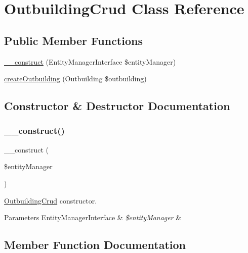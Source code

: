 \hypertarget{class_app_1_1_d_a_l_1_1_outbuilding_crud}{}\section{Outbuilding\+Crud Class Reference}
\label{class_app_1_1_d_a_l_1_1_outbuilding_crud}
\subsection*{Public Member Functions}
\begin{DoxyCompactItemize}
\item 
\mbox{\hyperlink{class_app_1_1_d_a_l_1_1_outbuilding_crud_abb5fb9a65dd8a81e7482dddbf71c5177}{\+\_\+\+\_\+construct}} (Entity\+Manager\+Interface \$entity\+Manager)
\item 
\mbox{\hyperlink{class_app_1_1_d_a_l_1_1_outbuilding_crud_a37a103c3b24392ec438f2dec314c0537}{create\+Outbuilding}} (Outbuilding \$outbuilding)
\end{DoxyCompactItemize}


\subsection{Constructor \& Destructor Documentation}
\mbox{\label{class_app_1_1_d_a_l_1_1_outbuilding_crud_abb5fb9a65dd8a81e7482dddbf71c5177}} 
\subsubsection{\texorpdfstring{\_\_construct()}{\_\_construct()}}
{\footnotesize\ttfamily \+\_\+\+\_\+construct (\begin{DoxyParamCaption}\item[{Entity\+Manager\+Interface}]{\$entity\+Manager }\end{DoxyParamCaption})}

\mbox{\hyperlink{class_app_1_1_d_a_l_1_1_outbuilding_crud}{Outbuilding\+Crud}} constructor. 
\begin{DoxyParams}[1]{Parameters}
Entity\+Manager\+Interface & {\em \$entity\+Manager} & \\
\hline
\end{DoxyParams}


\subsection{Member Function Documentation}
\mbox{\label{class_app_1_1_d_a_l_1_1_outbuilding_crud_a37a103c3b24392ec438f2dec314c0537}} 
